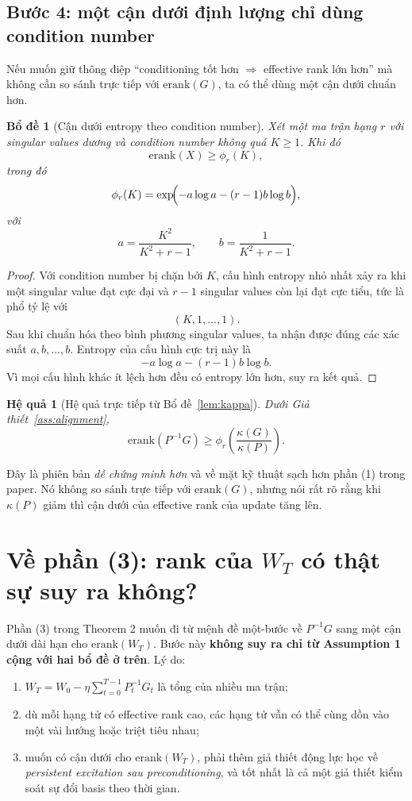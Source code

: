 \documentclass[11pt,a4paper]{article}
\newtheorem{lemma}{Bổ đề}
\newtheorem{corollary}{Hệ quả}
\newcommand{\erank}{\mathrm{erank}}
\begin{document}
\subsection*{Bước 4: một cận dưới định lượng chỉ dùng condition number}
Nếu muốn giữ thông điệp ``conditioning tốt hơn $\Rightarrow$ effective rank lớn hơn'' mà không cần so sánh trực tiếp với $\erank(G)$, ta có thể dùng một cận dưới chuẩn hơn.

\begin{lemma}[Cận dưới entropy theo condition number]
\label{lem:entropy-kappa}
Xét một ma trận hạng $r$ với singular values dương và condition number không quá $K\ge 1$. Khi đó
\[
\erank(X)\ge \phi_r(K),
\]
trong đó
\[
\phi_r(K)
=
\exp\!\Bigl(
-a\log a -(r-1)b\log b
\Bigr),
\]
với
\[
a=\frac{K^2}{K^2+r-1},
\qquad
b=\frac{1}{K^2+r-1}.
\]
\end{lemma}

\begin{proof}
Với condition number bị chặn bởi $K$, cấu hình entropy nhỏ nhất xảy ra khi một singular value đạt cực đại và $r-1$ singular values còn lại đạt cực tiểu, tức là phổ tỷ lệ với
\[
(K,1,\dots,1).
\]
Sau khi chuẩn hóa theo bình phương singular values, ta nhận được đúng các xác suất $a,b,\dots,b$. Entropy của cấu hình cực trị này là
\[
-a\log a -(r-1)b\log b.
\]
Vì mọi cấu hình khác ít lệch hơn đều có entropy lớn hơn, suy ra kết quả.
\end{proof}

\begin{corollary}[Hệ quả trực tiếp từ Bổ đề~\ref{lem:kappa}]
\label{cor:clean-bound}
Dưới Giả thiết~\ref{ass:alignment},
\[
\erank(P^{-1}G)\ge \phi_r\!\left(\frac{\kappa(G)}{\kappa(P)}\right).
\]
\end{corollary}

\noindent
Đây là phiên bản \emph{dễ chứng minh hơn} và về mặt kỹ thuật sạch hơn phần (1) trong paper. Nó không so sánh trực tiếp với $\erank(G)$, nhưng nói rất rõ rằng khi $\kappa(P)$ giảm thì cận dưới của effective rank của update tăng lên.

\section*{Về phần (3): rank của $W_T$ có thật sự suy ra không?}
Phần (3) trong Theorem 2 muốn đi từ mệnh đề một-bước về $P^{-1}G$ sang một cận dưới dài hạn cho $\erank(W_T)$. Bước này \textbf{không suy ra chỉ từ Assumption 1 cộng với hai bổ đề ở trên}. Lý do:
\begin{enumerate}[nosep]
    \item $W_T=W_0-\eta\sum_{t=0}^{T-1}P_t^{-1}G_t$ là tổng của nhiều ma trận;
    \item dù mỗi hạng tử có effective rank cao, các hạng tử vẫn có thể cùng dồn vào một vài hướng hoặc triệt tiêu nhau;
    \item muốn có cận dưới cho $\erank(W_T)$, phải thêm giả thiết động lực học về \emph{persistent excitation sau preconditioning}, và tốt nhất là cả một giả thiết kiểm soát sự đổi basis theo thời gian.
\end{enumerate}
\end{document}
